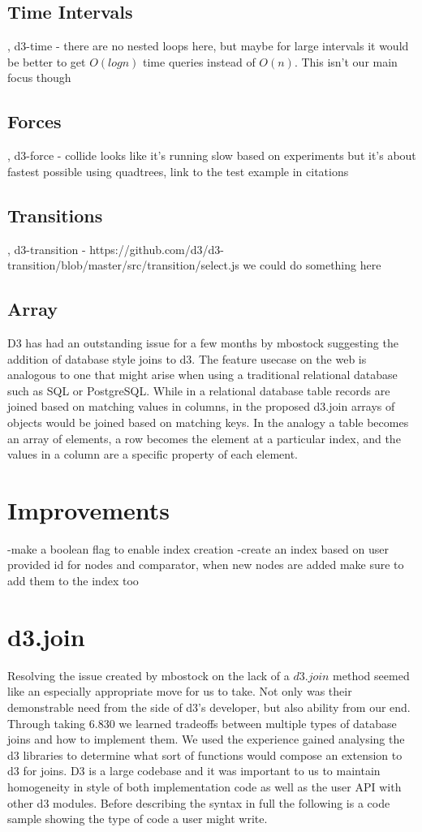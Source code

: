 \documentclass[a4paper]{article}
\begin{document}
\subsection{Time Intervals}, d3-time - there are no nested loops here, but maybe for large intervals it would be better to get $O(logn)$ time queries instead of $O(n)$. This isn't our main focus though

\subsection{Forces}, d3-force - collide looks like it's running slow based on experiments but it's about fastest possible using quadtrees, link to the test example in citations

\subsection{Transitions}, d3-transition - https://github.com/d3/d3-transition/blob/master/src/transition/select.js we could do something here

\subsection{Array}
	D3 has had an outstanding issue for a few months by mbostock suggesting the addition of database style joins to d3. The feature usecase on the web is analogous to one that might arise when using a traditional relational database such as SQL or PostgreSQL. While in a relational database table records are joined based on matching values in columns, in the proposed d3.join arrays of objects would be joined based on matching keys. In the analogy a table becomes an array of elements, a row becomes the element at a particular index, and the values in a column are a specific property of each element.

\section{Improvements}
-make a boolean flag to enable index creation
-create an index based on user provided id for nodes and comparator, when new nodes are added make sure to add them to the index too

\section{d3.join}
	Resolving the issue created by mbostock on the lack of a $d3.join$ method seemed like an especially appropriate move for us to take. Not only was their demonstrable need from the side of d3's developer, but also ability from our end. Through taking 6.830 we learned tradeoffs between multiple types of database joins and how to implement them. We used the experience gained analysing the d3 libraries to determine what sort of functions would compose an extension to d3 for joins. D3 is a large codebase and it was important to us to maintain homogeneity in style of both implementation code as well as the user API with other d3 modules. Before describing the syntax in full the following is a code sample showing the type of code a user might write.
	
\end{document}
